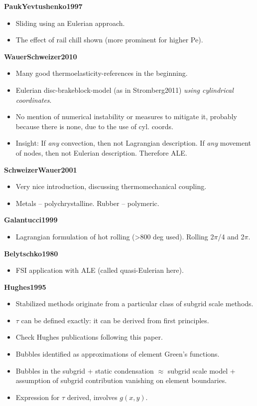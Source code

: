 \documentclass{article}
\begin{document}
\textbf{PaukYevtushenko1997}
\begin{itemize}
\item Sliding using an Eulerian approach.
\item The effect of rail chill shown (more prominent for higher Pe).
\end{itemize}

\textbf{WauerSchweizer2010}
\begin{itemize}
\item Many good thermoelasticity-references in the beginning.
\item Eulerian disc-brakeblock-model (as in Stromberg2011) \emph{using cylindrical coordinates}.
\item No mention of numerical instability or measures to mitigate it, probably because there is none, due to the use of cyl. coords.
\item Insight: If \emph{any} convection, then not Lagrangian description. If \emph{any} movement of nodes, then not Eulerian description. Therefore ALE.
\end{itemize}

\textbf{SchweizerWauer2001}
\begin{itemize}
\item Very nice introduction, discussing thermomechanical coupling.
\item Metals -- polychrystalline. Rubber -- polymeric.
\end{itemize}

\textbf{Galantucci1999}
\begin{itemize}
\item Lagrangian formulation of hot rolling (>800 deg used). Rolling 2$\pi$/4 and 2$\pi$.
\end{itemize}

\textbf{Belytschko1980}
\begin{itemize}
\item FSI application with ALE (called quasi-Eulerian here).
\end{itemize}

\textbf{Hughes1995}
\begin{itemize}
\item Stabilized methods originate from a particular class of subgrid scale methods.
\item $\tau$ can be defined exactly: it can be derived from first principles.
\item Check Hughes publications following this paper.
\item Bubbles identified as approximations of element Green's functions.
\item Bubbles in the subgrid + static condensation $\approx$ subgrid scale model + assumption of subgrid contribution vanishing on element boundaries.
\item Expression for $\tau$ derived, involves $g(x,y)$.
\end{itemize}
\end{document}
